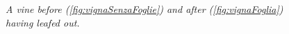 \begin{figure}
	\begin{minipage}[c]{.5\textwidth}
	\centering
	\end{minipage}
	\begin{minipage}[c]{.5\textwidth}
	\end{minipage}
	\caption{\textit{A vine before (\ref{fig:vignaSenzaFoglie}) and after (\ref{fig:vignaFoglia}) having leafed out.}}
	\label{fig:vignaConSenzaFoglie}
\end{figure}


